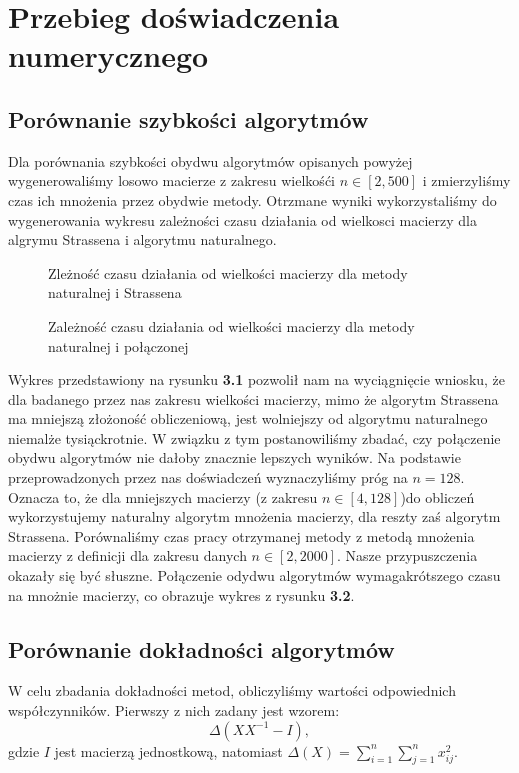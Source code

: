 \section{Przebieg doświadczenia numerycznego}
\subsection{Porównanie szybkości algorytmów}
Dla porównania szybkości obydwu algorytmów opisanych powyżej wygenerowaliśmy
losowo macierze z zakresu wielkośći $n \in [2, 500]$ i zmierzyliśmy czas ich
mnożenia przez obydwie metody. Otrzmane wyniki wykorzystaliśmy do wygenerowania wykresu zależności
czasu działania od wielkosci macierzy dla algrymu Strassena i algorytmu
naturalnego.
\begin{figure}[hb]
\begin{center}

\caption{Zleżność czasu działania od wielkości macierzy dla metody naturalnej i Strassena}
\end{center}
\end{figure}
\begin{figure}[hb]
\begin{center}

\caption{Zależność czasu działania od wielkości macierzy dla metody naturalnej i połączonej}
\end{center}
\end{figure}
Wykres przedstawiony na rysunku \textbf{3.1} pozwolił nam na wyciągnięcie wniosku, że dla badanego przez nas
zakresu wielkości macierzy, mimo że algorytm Strassena ma mniejszą złożoność
obliczeniową, jest wolniejszy od algorytmu naturalnego niemalże tysiąckrotnie. W związku z tym
postanowiliśmy zbadać, czy połączenie obydwu algorytmów nie dałoby znacznie
lepszych wyników. Na podstawie przeprowadzonych przez nas doświadczeń wyznaczyliśmy
próg na $n=128$. Oznacza to, że dla mniejszych macierzy (z zakresu
$n \in [4, 128]$)do obliczeń wykorzystujemy naturalny algorytm mnożenia macierzy,
dla reszty zaś algorytm Strassena. Porównaliśmy czas pracy otrzymanej metody z metodą
mnożenia macierzy z definicji dla zakresu danych $n \in [2, 2000]$. Nasze przypuszczenia okazały się być słuszne.
Połączenie odydwu algorytmów wymagakrótszego czasu na mnożnie macierzy, co obrazuje wykres z rysunku \textbf{3.2}.
\subsection{Porównanie dokładności algorytmów}
W celu zbadania dokładności metod, obliczyliśmy wartości odpowiednich
współczynników. Pierwszy z nich zadany jest wzorem:
$$\Delta(XX^{-1}-I),$$
gdzie $I$ jest macierzą jednostkową, natomiast $\Delta(X) = \sum_{i=1}^{n}
\sum_{j=1}^{n} x_{ij}^2.$

